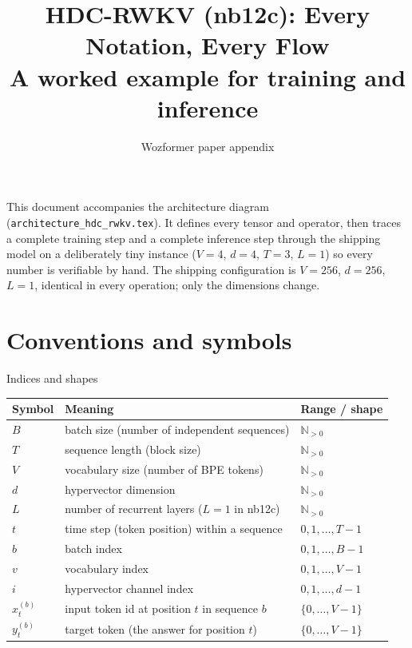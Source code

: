 \documentclass[11pt,a4paper]{article}
\title{HDC-RWKV (nb12c): Every Notation, Every Flow\\
       \large A worked example for training and inference}
\author{Wozformer paper appendix}
\date{}
\begin{document}
\maketitle

\noindent This document accompanies the architecture diagram
(\texttt{architecture\_hdc\_rwkv.tex}). It defines every tensor and operator,
then traces a complete training step and a complete inference step through
the shipping model on a deliberately tiny instance ($V{=}4$, $d{=}4$, $T{=}3$,
$L{=}1$) so every number is verifiable by hand. The shipping configuration is
$V{=}256$, $d{=}256$, $L{=}1$, identical in every operation; only the dimensions
change.

\tableofcontents

\section{Conventions and symbols}

\begin{notation}{Indices and shapes}
\begin{tabular}{@{}lll@{}}
\toprule
Symbol & Meaning & Range / shape \\
\midrule
$B$       & batch size (number of independent sequences) & $\mathbb{N}_{>0}$ \\
$T$       & sequence length (block size) & $\mathbb{N}_{>0}$ \\
$V$       & vocabulary size (number of BPE tokens) & $\mathbb{N}_{>0}$ \\
$d$       & hypervector dimension & $\mathbb{N}_{>0}$ \\
$L$       & number of recurrent layers ($L{=}1$ in nb12c) & $\mathbb{N}_{>0}$ \\
$t$       & time step (token position) within a sequence & $0,1,\dots,T{-}1$ \\
$b$       & batch index & $0,1,\dots,B{-}1$ \\
$v$       & vocabulary index & $0,1,\dots,V{-}1$ \\
$i$       & hypervector channel index & $0,1,\dots,d{-}1$ \\
$x_t^{(b)}$ & input token id at position $t$ in sequence $b$ & $\{0,\dots,V{-}1\}$ \\
$y_t^{(b)}$ & target token (the answer for position $t$) & $\{0,\dots,V{-}1\}$ \\
\bottomrule
\end{tabular}
\end{notation}
\end{document}
